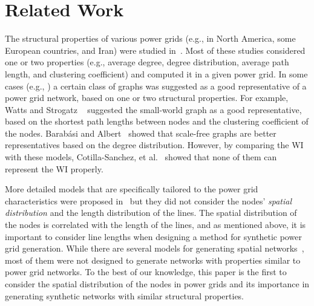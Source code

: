 \documentclass[10pt,journal]{IEEEtran}
\begin{document}
\section{Related Work}\label{sec:related}
The structural properties of various power grids (e.g., in North America, some European countries, and Iran) were studied in~\cite{watts1998collective,rosas2007topological,sole2008robustness,
monfared2014topology,crucitti2004topological,danziger2015two}.
Most of these studies considered one or two properties (e.g., average degree, degree distribution, average path length, and clustering coefficient) and computed it in a given power grid. In some cases (e.g., \cite{watts1998collective,barabasi1999emergence,amaral2000classes,albert2004structural,crucitti2004topological,chassin2005evaluating,cotilla2012comparing}) a certain class of graphs was suggested as a good representative of a power grid network, based on one or two structural properties. For example, Watts and Strogatz ~\cite{watts1998collective} suggested the small-world graph as a good representative, based on the shortest path lengths between nodes and the clustering coefficient of the nodes. Barab\'{a}si and Albert~\cite{barabasi1999emergence} showed that scale-free graphs are better representatives based on the degree distribution. However, by comparing the WI with these models, Cotilla-Sanchez, et al.~\cite{cotilla2012comparing} showed that none of them can represent the WI properly.





More detailed models that are specifically tailored to the power grid characteristics  were proposed in~\cite{wang2010generating,schultz2014random} but they did not consider the nodes' \emph{spatial distribution} and the length distribution of the lines. The spatial distribution of the nodes is correlated with the length of the lines, and as mentioned above,
it is important to consider line lengths when designing a method for synthetic power grid generation.  While there are several models for generating spatial networks~\cite{marc2010spatial,manna2002modulated,xulvi2002evolving}, most of them were not designed to generate networks with properties similar to power grid networks. To the best of our knowledge, this paper is the first to consider the spatial distribution of the nodes in power grids and its importance in generating synthetic networks with similar structural properties.
\end{document}
